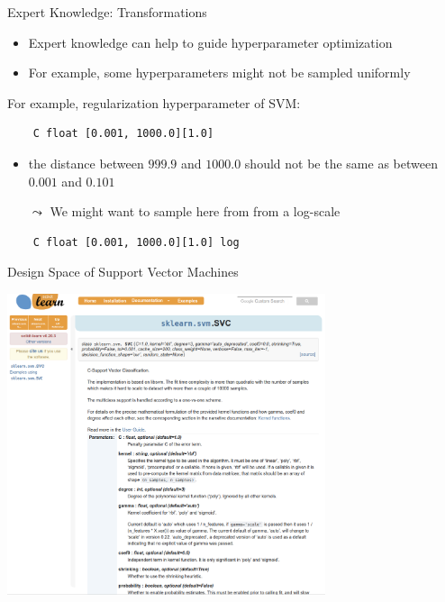 \begin{frame}[c, fragile]{Expert Knowledge: Transformations}

\begin{itemize}
	\item Expert knowledge can help to guide hyperparameter optimization
	\item For example, some hyperparameters might not be sampled uniformly
\end{itemize}

\pause
\medskip
For example, regularization hyperparameter of SVM:

\begin{verbatim}
    C float [0.001, 1000.0][1.0]
\end{verbatim}

\begin{itemize}
	\item the distance between $999.9$ and $1000.0$ should not be the same as between $0.001$ and $0.101$
	\smallskip
	\pause
	\item[$\leadsto$] We might want to sample here from from a log-scale
\end{itemize}

\begin{verbatim}
    C float [0.001, 1000.0][1.0] log
\end{verbatim}

\end{frame}
\begin{frame}[c]{Design Space of Support Vector Machines}

\centering
\includegraphics[width=0.7\textwidth]{images/sklearn_svm_doc.png}

\end{frame}
